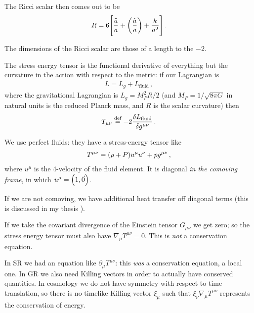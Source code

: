\documentclass[main.tex]{subfiles}
\begin{document}
The Ricci scalar then comes out to be 
%
\begin{align}
R = 6 \qty[\frac{\ddot{a}}{a} + \qty(\frac{\dot{a}}{a}) + \frac{k}{a^2}]
\,.
\end{align}

The dimensions of the Ricci scalar are those of a length to the \(-2\). 

The stress energy tensor is the functional derivative of everything but the curvature in the action with respect to the metric: if our Lagrangian is 
%
\begin{align}
L = L_{g} + L_{\text{fluid}}
\,,
\end{align}
%
where the gravitational Lagrangian is \(L_{g} = M_P^2 R /2 \) (and \(M_P = 1 / \sqrt{8 \pi G}\) in natural units is the reduced Planck mass, and \(R\) is the scalar curvature) then 
%
\begin{align}
T_{\mu \nu } \overset{\text{def}}{=} -2 \fdv{L_{\text{fluid}}}{g^{\mu \nu }}
\,.
\end{align}


We use perfect fluids: they have a stress-energy tensor like 
%
\begin{align}
T^{\mu \nu } =  \qty(\rho + P) u^{\mu } u^{\nu } + p g^{\mu \nu }
\,,
\end{align}
%
where \(u^{\mu }\) is the 4-velocity of the fluid element. 
It is diagonal \emph{in the comoving frame}, in which \(u^{\mu } = \qty(1, \vec{0})\).

If we are not comoving, we have additional heat transfer off diagonal terms (this is discussed in my thesis \cite[section 4.2]{tissinoRelativisticNonidealFlows2019}). 

If we take the covariant divergence of the Einstein tensor \(G_{\mu \nu }\) we get zero; so the stress energy tensor must also have \(\nabla_{\mu} T^{\mu \nu }=0\). 
This is \emph{not} a conservation equation. 

In SR we had an equation like \(\partial_{\mu}  T^{\mu \nu }\): this \emph{was} a conservation equation, a local one. 
In GR we also need Killing vectors in order to actually have conserved quantities. In cosmology we do not have symmetry with respect to time translation, so there is no timelike Killing vector \(\xi_{\mu }\) such that \(\xi_{\nu } \nabla_{\mu } T^{\mu \nu }\) represents the conservation of energy.
\end{document}
